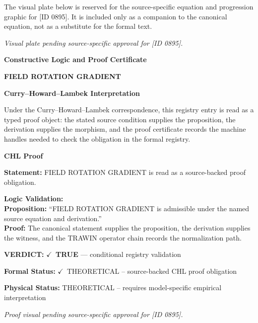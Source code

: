 \begingroup\footnotesize\sloppy
The visual plate below is reserved for the source-specific equation and progression graphic for [ID 0895]. It is included only as a companion to the canonical equation, not as a substitute for the formal text.
\par\endgroup
\begingroup\footnotesize\itshape
Visual plate pending source-specific approval for [ID 0895].
\par\endgroup

\clearpage
\begingroup\tzpsupportsetup
\noindent\textbf{\fontsize{10.8pt}{12.8pt}\selectfont [ID 0895] Constructive Logic and Proof Certificate}\par
\noindent\textbf{\fontsize{10pt}{12pt}\selectfont FIELD ROTATION GRADIENT}\par
\vspace{0.45em}
\begingroup
\footnotesize
\setlength{\parskip}{0.22em}
\setlength{\parindent}{0pt}
\noindent\textbf{Curry--Howard--Lambek Interpretation}\par
Under the Curry--Howard--Lambek correspondence, this registry entry is read as a typed proof
object: the stated source condition supplies the proposition, the derivation supplies the
morphism, and the proof certificate records the machine handles needed to check the obligation
in the formal registry.

\vspace{0.45em}
\noindent\textbf{CHL Proof}\par
\textbf{Statement:} FIELD ROTATION GRADIENT is read as a source-backed proof obligation.

\textbf{Logic Validation:}\\
\textbf{Proposition:} ``FIELD ROTATION GRADIENT is admissible under the named source equation and derivation.''\\
\textbf{Proof:} The canonical statement supplies the proposition, the derivation supplies the witness, and the TRAWIN operator chain records the normalization path.

\textbf{VERDICT:} \ensuremath{\checkmark}\ \textbf{TRUE} --- conditional registry validation

\textbf{Formal Status:} \ensuremath{\checkmark}\ THEORETICAL -- source-backed CHL proof obligation

\textbf{Physical Status:} THEORETICAL -- requires model-specific empirical interpretation
\par\vspace{0.45em}
\par
\vfill
\begingroup\footnotesize\itshape
Proof visual pending source-specific approval for [ID 0895].
\par\endgroup
\vfill
\endgroup
\endgroup
